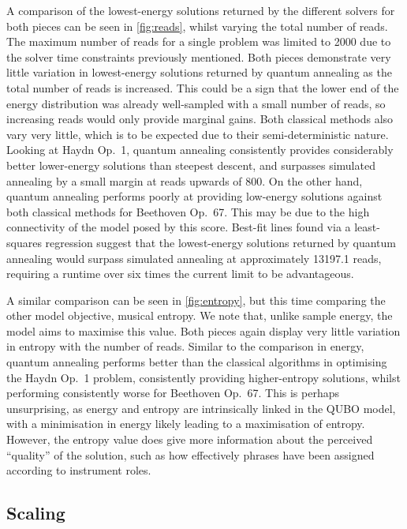 \documentclass[12pt]{article}
\theoremstyle{definition}
\begin{document}
A comparison of the lowest-energy solutions returned by the different solvers for both pieces can be seen in \cref{fig:reads}, whilst varying the total number of reads. The maximum number of reads for a single problem was limited to \num{2000} due to the solver time constraints previously mentioned. Both pieces demonstrate very little variation in lowest-energy solutions returned by quantum annealing as the total number of reads is increased. This could be a sign that the lower end of the energy distribution was already well-sampled with a small number of reads, so increasing reads would only provide marginal gains. Both classical methods also vary very little, which is to be expected due to their semi-deterministic nature.
Looking at Haydn Op.\ 1, quantum annealing consistently provides considerably better lower-energy solutions than steepest descent, and surpasses simulated annealing by a small margin at reads upwards of \num{800}.
On the other hand, quantum annealing performs poorly at providing low-energy solutions against both classical methods for Beethoven Op.\ 67. This may be due to the high connectivity of the model posed by this score. Best-fit lines found via a least-squares regression suggest that the lowest-energy solutions returned by quantum annealing would surpass simulated annealing at approximately \num{13197.1} reads, requiring a runtime over six times the current limit to be advantageous.

A similar comparison can be seen in \cref{fig:entropy}, but this time comparing the other model objective, musical entropy. We note that, unlike sample energy, the model aims to maximise this value. Both pieces again display very little variation in entropy with the number of reads. Similar to the comparison in energy, quantum annealing performs better than the classical algorithms in optimising the Haydn Op.\ 1 problem, consistently providing higher-entropy solutions, whilst performing consistently worse for Beethoven Op.\ 67. This is perhaps unsurprising, as energy and entropy are intrinsically linked in the QUBO model, with a minimisation in energy likely leading to a maximisation of entropy. However, the entropy value does give more information about the perceived ``quality'' of the solution, such as how effectively phrases have been assigned according to instrument roles.

\subsection{Scaling}
\end{document}
